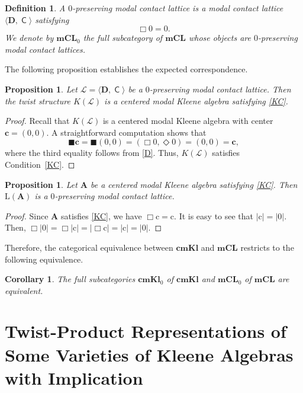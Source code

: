 \documentclass{article}
\newtheorem{proposition}[theorem]{Proposition}
\newtheorem{corollary}[theorem]{Corollary}
\newtheorem{definition}[theorem]{Definition}
\DeclareMathOperator{\con}{\mathsf{C}}
\newcommand{\cn}{\mathrm{c}}
\newcommand{\cbf}{\mathbf{c}}
\newcommand{\A}{\mathbf{A}}
\newcommand{\D}{\mathbf{D}}
\newcommand{\boxn}{\blacksquare}
\begin{document}
\begin{definition}
A \emph{$0$-preserving modal contact lattice} is a modal contact lattice
$\langle\D,\con\rangle$ satisfying
\begin{equation}
\label{D}\tag{D}
\Box0=0.
\end{equation}
We denote by $\mathbf{mCL}_0$ the full subcategory of $\mathbf{mCL}$ whose objects are $0$-preserving modal contact lattices.
\end{definition}

The following proposition establishes the expected correspondence.

\begin{proposition}
\label{pro:mCLc-mKLc}
Let $\mathcal{L}=\langle\D,\con\rangle$ be a $0$-preserving modal contact lattice. Then the twist structure $K(\mathcal{L})$
is a centered modal Kleene algebra satisfying \eqref{KC}.
\end{proposition}
\begin{proof}
Recall that $K(\mathcal{L})$ is a centered modal Kleene algebra with center
$\cbf=(0,0)$.  A straightforward computation shows that 
\[
\boxn\cbf
=\boxn(0,0)
=(\Box0,\Diamond0)
=(0,0)
=\cbf,
\]
where the third equality follows from \eqref{D}.  Thus,
$K(\mathcal{L})$ satisfies Condition~\eqref{KC}.
\end{proof}

\begin{proposition}
Let $\A$ be a centered modal Kleene algebra satisfying \eqref{KC}. Then
$\mathrm{L}(\A)$ is a $0$-preserving modal contact lattice.
\end{proposition}
\begin{proof}
Since $\A$ satisfies \eqref{KC}, we have $\Box \cn=\cn$. It is easy to see that $|\cn|=|0|$. Then, $\Box |0|=\Box |\cn|=|\Box \cn|=|\cn|=|0|$.
\end{proof}

Therefore, the categorical equivalence between $\mathbf{cmKl}$ and
$\mathbf{mCL}$ restricts to the following equivalence.

\begin{corollary}
\label{cor:equiv-mKLc-mCLc}
The full subcategories $\mathbf{cmKl}_0$ of $\mathbf{cmKl}$ and
$\mathbf{mCL}_0$ of $\mathbf{mCL}$ are equivalent.
\end{corollary}


\section{Twist-Product Representations of Some Varieties of Kleene Algebras with Implication}\label{sec:implicative}
\end{document}
